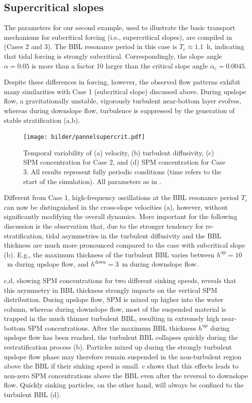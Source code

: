 \subsection{Supercritical slopes}
The parameters for our second example, used to illustrate the basic
transport mechanisms for subcritical forcing (i.e., supercritical
slopes), are compiled in  (Cases 2 and 3). The BBL
resonance period in this case is $T_c \approx 1.1$~h, indicating that
tidal forcing is strongly subcritical. Correspondingly, the slope
angle $\alpha = 0.05$ is more than a factor 10 larger than the
critical slope angle $\alpha_c = 0.0045$.

Despite these differences in forcing, however, the observed flow
patterns exhibit many similarities with Case 1 (subcritical slope)
discussed above. During upslope flow, a gravitationally unstable,
vigorously turbulent near-bottom layer evolves, whereas during
downslope flow, turbulence is suppressed by the generation of stable
stratification (a,b). 
\begin{figure}[h]
  \noindent\texttt{[image: bilder/pannelsupercrit.pdf]}\\
  \caption{Temporal variability of (a) velocity, (b) turbulent
    diffusivity, (c) SPM concentration for Case 2, and (d) SPM
    concentration for Case 3. All results represent fully periodic
    conditions (time refers to the start of the simulation). All
    parameters as in .}\label{pannelsupercrit}
\end{figure}

Different from Case 1,
high-frequency oscillations at the BBL resonance period $T_c$ can now
be distinguished in the cross-slope velocities
(a), however, without significantly modifying the
overall dynamics. More important for the following discussion is the
observation that, due to the stronger tendency for re-stratification,
tidal asymmetries in the turbulent diffusivity and the BBL thickness
are much more pronounced compared to the case with subcritical slope
(b). E.g., the maximum thickness of the turbulent
BBL varies between $h^\text{up} = 10$~m during upslope flow, and
$h^\text{down} = 3$~m during downslope flow.

c,d, showing SPM concentrations for two different
sinking speeds, reveals that this asymmetry in BBL thickness strongly
impacts on the vertical SPM distribution.  During upslope flow, SPM is
mixed up higher into the water column, whereas during downslope flow,
most of the suspended material is trapped in the much thinner
turbulent BBL, resulting in extremely high near-bottom SPM
concentrations. After the maximum BBL thickness $h^\text{up}$ during
upslope flow has been reached, the turbulent BBL collapses quickly
during the restratification process
(b). Particles mixed up during the strongly
turbulent upslope flow phase may therefore remain suspended in the
non-turbulent region above the BBL if their sinking speed is
small. c shows that this effects leads to
non-zero SPM concentrations above the BBL even after the reversal to
downslope flow.  Quickly sinking particles, on the other hand, will
always be confined to the turbulent BBL (d).

